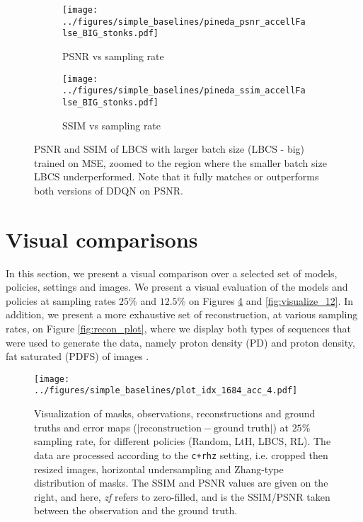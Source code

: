 \begin{figure}[!ht]
    \centering
    \begin{subfigure}[b]{.49\textwidth}
    \centering
    \texttt{[image: ../figures/simple\_baselines/pineda\_psnr\_accellFalse\_BIG\_stonks.pdf]}
    \caption{PSNR vs sampling rate}
    \label{fig:psnr_big_lbcs}
    \end{subfigure}
    \begin{subfigure}[b]{.49\textwidth}
    \centering
    \texttt{[image: ../figures/simple\_baselines/pineda\_ssim\_accellFalse\_BIG\_stonks.pdf]}
    \caption{SSIM vs sampling rate}
    \label{fig:ssim_big_lbcs}
    \end{subfigure}
    \vspace{-.2cm}
    \caption{PSNR and SSIM of LBCS with larger batch size (LBCS - big) trained on MSE, zoomed to the region where the smaller batch size LBCS underperformed. Note that it fully matches or outperforms both versions of DDQN on PSNR.}
    \vspace{-.4cm}
    \label{fig:lbcs_big}
\end{figure}

\clearpage
\FloatBarrier
\section{Visual comparisons}

In this section, we present a visual comparison over a selected set of models, policies, settings and images. We present a visual evaluation of the models and policies at sampling rates $25\%$ and $12.5\%$ on Figures \ref{fig:visualize_25} and \ref{fig:visualize_12}. In addition, we present a more exhaustive set of reconstruction, at various sampling rates, on Figure \ref{fig:recon_plot}, where we display both types of sequences that were used to generate the data, namely proton density (PD) and proton density, fat saturated (PDFS) of images \citep{zbontarFastMRIOpenDataset2019}.


\begin{figure}[ht]
    \centering
    \texttt{[image: ../figures/simple\_baselines/plot\_idx\_1684\_acc\_4.pdf]}
    \caption{Visualization of masks, observations, reconstructions and ground truths and error maps ($|\text{reconstruction}-\text{ground truth}|$) at $25\%$ sampling rate, for different policies (Random, LtH, LBCS, RL). The data are processed according to the \texttt{c+rhz} setting, i.e. cropped then resized images, horizontal undersampling and Zhang-type distribution of masks. The SSIM and PSNR values are given on the right, and here, \textit{zf} refers to zero-filled, and is the SSIM/PSNR taken between the observation and the ground truth.}
    \label{fig:visualize_25}
    \vspace{-.4cm}
\end{figure}


